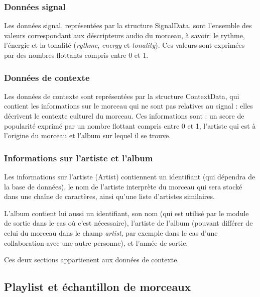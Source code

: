 \subsubsection{Données signal}
\label{archi:structures:morceau:signal}

Les données signal, représentées par la structure SignalData, sont 
l'ensemble des valeurs correspondant aux déscripteurs audio du morceau, à 
savoir: le rythme, l'énergie et la tonalité (\textit{rythme}, \textit{energy}
 et \textit{tonality}). Ces valeurs sont exprimées par des nombres flottants 
 compris entre 0 et 1.

\subsubsection{Données de contexte}
\label{archi:structures:morceau:contexte}

Les données de contexte sont représentées par la structure ContextData, qui 
contient les informations sur le morceau qui ne sont pas relatives au 
signal : elles décrivent le contexte culturel du morceau. Ces informations 
sont :  un score de popularité exprimé par un nombre flottant compris entre 
0 et 1, l'artiste qui est à l'origine du morceau et l'album sur lequel il 
se trouve.

\subsubsection{Informations sur l'artiste et l'album}
\label{archi:structures:morceau:artiste}

Les informations sur l'artiste (Artist) contiennent un identifiant (qui 
dépendra de la base de données), le nom de l'artiste interprète du morceau 
qui sera stocké dans une chaîne de caractères, ainsi qu'une liste d'artistes 
similaires.

L'album contient lui aussi un identifiant, son nom (qui est utilisé par le 
module de sortie dans le cas où c'est nécessaire), l'artiste de l'album 
(pouvant différer de celui du morceau dans le champ \textit{artist}, par 
exemple dans le cas d'une collaboration avec une autre personne), et l'année 
de sortie.

Ces deux sections appartienent aux données de contexte.

\subsection{Playlist et échantillon de morceaux}
\label{archi:structures:playlist}

